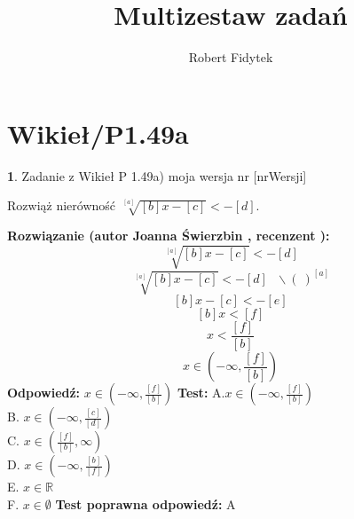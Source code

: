 \documentclass[12pt, a4paper]{article}
\title{Multizestaw zadań}
\author{Robert Fidytek}
\date{}
\theoremstyle{definition} %
\newtheorem{zad}{}
\newcommand{\kategoria}[1]{\section{#1}} %
\newcommand{\zadStart}[1]{\begin{zad}#1\newline} %
\newcommand{\zadStop}{\end{zad}}   %
\newcommand{\rozwStart}[2]{\noindent \textbf{Rozwiązanie (autor #1 , recenzent #2): }\newline} %
\newcommand{\rozwStop}{\newline}                                            %
\newcommand{\odpStart}{\noindent \textbf{Odpowiedź:}\newline}    %
\newcommand{\odpStop}{\newline}                                             %
\newcommand{\testStart}{\noindent \textbf{Test:}\newline} %
\newcommand{\testStop}{\newline} %
\newcommand{\kluczStart}{\noindent \textbf{Test poprawna odpowiedź:}\newline} %
\newcommand{\kluczStop}{\newline} %
\begin{document}
\maketitle


\kategoria{Wikieł/P1.49a}
\zadStart{Zadanie z Wikieł P 1.49a) moja wersja nr [nrWersji]}

Rozwiąż nierówność $\sqrt[{[a]}]{[b]x-[c]}<-[d]$.
\zadStop
\rozwStart{Joanna Świerzbin}{}
$$\sqrt[{[a]}]{[b]x-[c]}<-[d]$$
$$\sqrt[{[a]}]{[b]x-[c]}<-[d] \ \ \  \backslash (\ )^{[a]}$$
$$ [b]x-[c]<-[e] $$
$$ [b]x<[f] $$
$$ x<\frac{[f]}{[b]} $$
$$ x \in \left( -\infty, \frac{[f]}{[b]} \right) $$
\rozwStop
\odpStart
$ x \in \left( -\infty, \frac{[f]}{[b]} \right) $
\odpStop
\testStart
A.$ x \in \left( -\infty, \frac{[f]}{[b]} \right) $\\
B. $ x \in \left( -\infty, \frac{[c]}{[d]} \right) $ \\
C. $ x \in \left( \frac{[f]}{[b]}, \infty \right) $ \\
D. $ x \in \left( -\infty, \frac{[b]}{[f]} \right) $ \\
E. $ x \in \mathbb{R} $\\
F. $ x \in \emptyset $
\testStop
\kluczStart
A
\kluczStop
\end{document}
